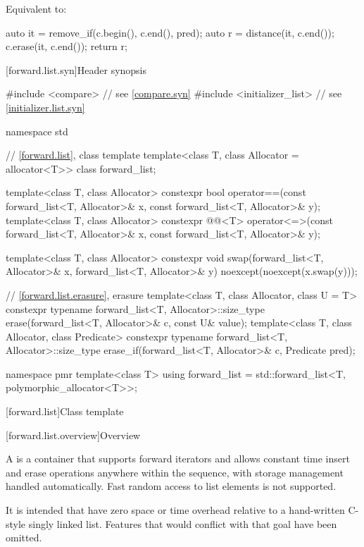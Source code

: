 \begin{itemdescr}
\pnum
\effects
Equivalent to:
\begin{codeblock}
auto it = remove_if(c.begin(), c.end(), pred);
auto r = distance(it, c.end());
c.erase(it, c.end());
return r;
\end{codeblock}
\end{itemdescr}

[forward.list.syn]{Header  synopsis}

%
\begin{codeblock}
#include <compare>              // see \ref{compare.syn}
#include <initializer_list>     // see \ref{initializer.list.syn}

namespace std {
  // \ref{forward.list}, class template 
  template<class T, class Allocator = allocator<T>> class forward_list;

  template<class T, class Allocator>
    constexpr bool operator==(const forward_list<T, Allocator>& x,
                              const forward_list<T, Allocator>& y);
  template<class T, class Allocator>
    constexpr @@<T>
      operator<=>(const forward_list<T, Allocator>& x,
                  const forward_list<T, Allocator>& y);

  template<class T, class Allocator>
    constexpr void swap(forward_list<T, Allocator>& x, forward_list<T, Allocator>& y)
      noexcept(noexcept(x.swap(y)));

  // \ref{forward.list.erasure}, erasure
  template<class T, class Allocator, class U = T>
    constexpr typename forward_list<T, Allocator>::size_type
      erase(forward_list<T, Allocator>& c, const U& value);
  template<class T, class Allocator, class Predicate>
    constexpr typename forward_list<T, Allocator>::size_type
      erase_if(forward_list<T, Allocator>& c, Predicate pred);

  namespace pmr {
    template<class T>
      using forward_list = std::forward_list<T, polymorphic_allocator<T>>;
  }
}
\end{codeblock}

[forward.list]{Class template }

[forward.list.overview]{Overview}

\pnum
A  is a container that supports forward iterators and allows
constant time insert and erase operations anywhere within the sequence, with storage
management handled automatically. Fast random access to list elements is not supported.
\begin{note}
It is intended that  have zero space or time overhead
relative to a hand-written C-style singly linked list. Features that would conflict with
that goal have been omitted.
\end{note}

